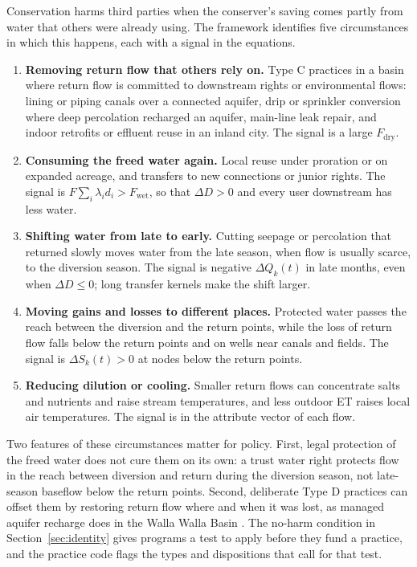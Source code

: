 \documentclass[11pt]{article}
\newcommand{\Fwet}{F_{\mathrm{wet}}}        %
\newcommand{\Fdry}{F_{\mathrm{dry}}}        %
\begin{document}
Conservation harms third parties when the conserver's saving comes partly from water that others were already using. The framework identifies five circumstances in which this happens, each with a signal in the equations.
\begin{enumerate}
  \item \textbf{Removing return flow that others rely on.} Type C practices in a basin where return flow is committed to downstream rights or environmental flows: lining or piping canals over a connected aquifer, drip or sprinkler conversion where deep percolation recharged an aquifer, main-line leak repair, and indoor retrofits or effluent reuse in an inland city. The signal is a large $\Fdry$.
  \item \textbf{Consuming the freed water again.} Local reuse under proration or on expanded acreage, and transfers to new connections or junior rights. The signal is $F \sum_i \lambda_i d_i > \Fwet$, so that $\Delta D > 0$ and every user downstream has less water.
  \item \textbf{Shifting water from late to early.} Cutting seepage or percolation that returned slowly moves water from the late season, when flow is usually scarce, to the diversion season. The signal is negative $\Delta Q_k(t)$ in late months, even when $\Delta D \le 0$; long transfer kernels make the shift larger.
  \item \textbf{Moving gains and losses to different places.} Protected water passes the reach between the diversion and the return points, while the loss of return flow falls below the return points and on wells near canals and fields. The signal is $\Delta S_k(t) > 0$ at nodes below the return points.
  \item \textbf{Reducing dilution or cooling.} Smaller return flows can concentrate salts and nutrients and raise stream temperatures, and less outdoor ET raises local air temperatures. The signal is in the attribute vector of each flow.
\end{enumerate}

Two features of these circumstances matter for policy. First, legal protection of the freed water does not cure them on its own: a trust water right protects flow in the reach between diversion and return during the diversion season, not late-season baseflow below the return points. Second, deliberate Type D practices can offset them by restoring return flow where and when it was lost, as managed aquifer recharge does in the Walla Walla Basin \citep{scherberg2018}. The no-harm condition in Section~\ref{sec:identity} gives programs a test to apply before they fund a practice, and the practice code flags the types and dispositions that call for that test.
\end{document}
